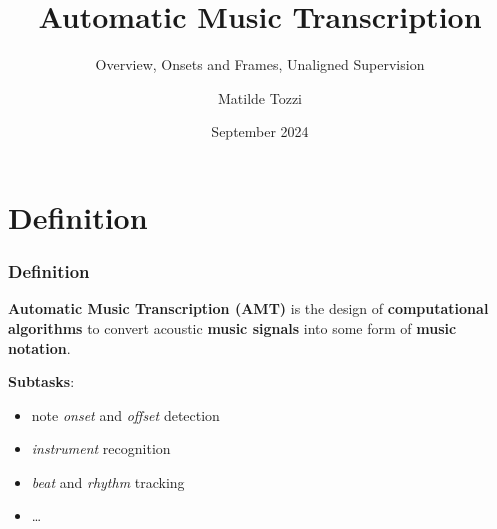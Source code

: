 \documentclass{beamer}
\title{Automatic Music Transcription}
\subtitle{Overview, Onsets and Frames, Unaligned Supervision}
\author{Matilde Tozzi}
\institute[]{Ferienakademie}
\date[September 2024]{September 2024}
\newcommand{\emp}[1]{\textcolor{tum}{\textbf{#1}}}
\begin{document}
\beamertemplatenavigationsymbolsempty

\begin{frame}
	\titlepage
\end{frame}



\section{Definition}
\begin{frame}
	\frametitle{Definition}
	\begin{block}{}
		\emp{Automatic Music Transcription (AMT)} is the design of \textbf{computational algorithms} to convert acoustic \textbf{music signals} into some form of \textbf{music notation}. \cite{Overview}
	\end{block}

	\vspace{5mm}

	\emp{Subtasks}:
	\begin{itemize}
		\item note \textit{onset} and \textit{offset} detection
		\item \textit{instrument} recognition
		\item \textit{beat} and \textit{rhythm} tracking
		\item \dots
	\end{itemize}
\end{frame}
\end{document}
